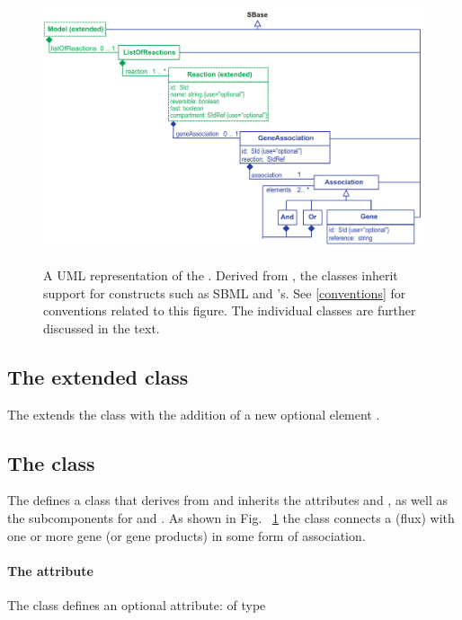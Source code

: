 \begin{figure}[h!]
  \centering
  \includegraphics[width=\textwidth]{images/fbc_uml_ga_all2.pdf}\\
  \caption{A UML representation of the \FBCPackage. Derived from \SBase, the \FBC classes inherit support for constructs such as SBML \Notes and \Annotation's. See \ref{conventions} for conventions related to this figure. The individual classes are further discussed in the text.}
  \label{fig:fbc_uml_ga_all}
\end{figure}

\subsection{The extended  class}
\label{reaction-class-ga}

The \FBCPackage extends the \sbmlthreecore \Reaction class with the addition
of a new optional element \GeneAssociation.

\subsection{The \FBC {} class}
\label{geneassociation-class}

The \FBCPackage defines a \GeneAssociation class that derives from \SBase and inherits the attributes  and , as well as the subcomponents for \Annotation and \Notes. As shown in Fig.~ \ref{fig:fbc_uml_ga_all} the \GeneAssociation class connects a \Reaction (flux) with one or more gene (or gene products) in some form of association.

\paragraph{The  attribute}
The \GeneAssociation class defines an optional attribute:  of type 

